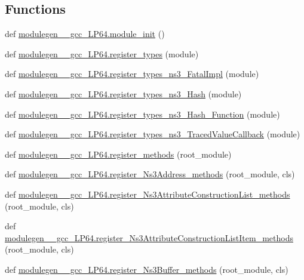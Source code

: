\subsection*{Functions}
\begin{DoxyCompactItemize}
\item 
def \hyperlink{namespacemodulegen____gcc__LP64_a6fa3bcd89827bb55aea467ffebc10531}{modulegen\+\_\+\+\_\+gcc\+\_\+\+L\+P64.\+module\+\_\+init} ()
\item 
def \hyperlink{namespacemodulegen____gcc__LP64_ab61bb54af74e931fcb41c8f8677a8eb5}{modulegen\+\_\+\+\_\+gcc\+\_\+\+L\+P64.\+register\+\_\+types} (module)
\item 
def \hyperlink{namespacemodulegen____gcc__LP64_a2262e0d4e35e243aa3a1da10a2cb4e41}{modulegen\+\_\+\+\_\+gcc\+\_\+\+L\+P64.\+register\+\_\+types\+\_\+ns3\+\_\+\+Fatal\+Impl} (module)
\item 
def \hyperlink{namespacemodulegen____gcc__LP64_a93555c52620e0de62d76d0946d4554a2}{modulegen\+\_\+\+\_\+gcc\+\_\+\+L\+P64.\+register\+\_\+types\+\_\+ns3\+\_\+\+Hash} (module)
\item 
def \hyperlink{namespacemodulegen____gcc__LP64_a3e77b4168f4d6176242961c3f3cd12f0}{modulegen\+\_\+\+\_\+gcc\+\_\+\+L\+P64.\+register\+\_\+types\+\_\+ns3\+\_\+\+Hash\+\_\+\+Function} (module)
\item 
def \hyperlink{namespacemodulegen____gcc__LP64_a932218c26ce11fb1473ffc3980f37614}{modulegen\+\_\+\+\_\+gcc\+\_\+\+L\+P64.\+register\+\_\+types\+\_\+ns3\+\_\+\+Traced\+Value\+Callback} (module)
\item 
def \hyperlink{namespacemodulegen____gcc__LP64_a8ac8e0786047c1ed08fed9bc1a45843d}{modulegen\+\_\+\+\_\+gcc\+\_\+\+L\+P64.\+register\+\_\+methods} (root\+\_\+module)
\item 
def \hyperlink{namespacemodulegen____gcc__LP64_a0bc87667cfe5a45fc4aa7c0de2ae51d2}{modulegen\+\_\+\+\_\+gcc\+\_\+\+L\+P64.\+register\+\_\+\+Ns3\+Address\+\_\+methods} (root\+\_\+module, cls)
\item 
def \hyperlink{namespacemodulegen____gcc__LP64_a4dea76fc9218ba239313d01e5ac1d4cd}{modulegen\+\_\+\+\_\+gcc\+\_\+\+L\+P64.\+register\+\_\+\+Ns3\+Attribute\+Construction\+List\+\_\+methods} (root\+\_\+module, cls)
\item 
def \hyperlink{namespacemodulegen____gcc__LP64_a897162c4bcad09fae06079f3c1b24777}{modulegen\+\_\+\+\_\+gcc\+\_\+\+L\+P64.\+register\+\_\+\+Ns3\+Attribute\+Construction\+List\+Item\+\_\+methods} (root\+\_\+module, cls)
\item 
def \hyperlink{namespacemodulegen____gcc__LP64_ad545f8eb2320e09bf6e5be02690b4eaa}{modulegen\+\_\+\+\_\+gcc\+\_\+\+L\+P64.\+register\+\_\+\+Ns3\+Buffer\+\_\+methods} (root\+\_\+module, cls)

\end{DoxyCompactItemize}
